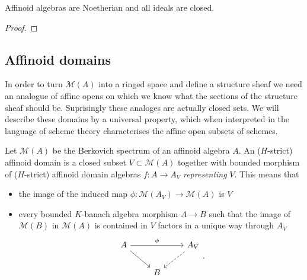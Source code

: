 \begin{proposition}
	Affinoid algebras are Noetherian and all ideals are closed. 
\end{proposition}
\begin{proof}
\end{proof}

\subsection{Affinoid domains} \label{sec:affinoid_domains}

In order to turn $\mathcal{M} (A)$ into a ringed space and define a structure sheaf we need an analogue of affine opens on which we know what the sections of the structure sheaf should be. 
Suprisingly these analoges are actually closed sets.  
We will describe these domains by a universal property, which when interpreted in the language of scheme theory characterises the affine open subsets of schemes. 

\begin{definition}
	Let $\mathcal{M} (A)$ be the Berkovich spectrum of an affinoid algebra $A$. 
	An ($H$-strict) affinoid domain is a closed subset $V \subset  \mathcal{M} (A)$ together with bounded morphism of ($H$-strict) affinoid domain algebras $f:A \to A_V$ \emph{representing} $V$.
	This means that 
	\begin{itemize}
		\item the image of the induced map $\phi:\mathcal{M} (A_V) \to \mathcal{M} (A)$ is $V$ 
		\item every bounded $K$-banach algebra morphism $A \to B$ such that the image of $\mathcal{M} (B)$ in $\mathcal{M} (A)$ is contained in $V$ factors in a unique way through $A_V$ \[
	\begin{tikzcd}
		A \ar{rr}{\phi} \ar{dr}& & A_V \ar[dashed]{dl} \\
				& B
	\end{tikzcd}
	.\] 
	\end{itemize}
\end{definition}

